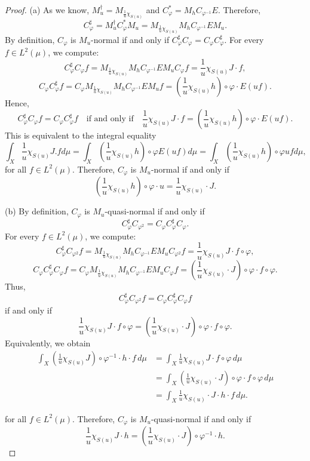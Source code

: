 \documentclass{amsart}
\theoremstyle{definition}\newtheorem{defn}[thm]{Definition}
\theoremstyle{remark}
\numberwithin{equation}{section}
\begin{document}
\begin{proof}
(a) As we know, \( M_u^\dagger = M_{\frac{1}{u} \chi_{S(u)}} \) and \( C_\varphi^* = M_h C_{\varphi^{-1}} E \). Therefore,
\[
C_\varphi^\sharp = M_u^\dagger C_\varphi^* M_u = M_{\frac{1}{u} \chi_{S(u)}} M_h C_{\varphi^{-1}} E M_u.
\]
By definition, \( C_\varphi \) is \( M_u \)-normal if and only if \( C_\varphi^\sharp C_\varphi = C_\varphi C_\varphi^\sharp \). For every \( f \in L^2(\mu) \), we compute:
\[
C_\varphi^\sharp C_\varphi f = M_{\frac{1}{u} \chi_{S(u)}} M_h C_{\varphi^{-1}} E M_u C_\varphi f = \frac{1}{u} \chi_{S(u)} J \cdot f,
\]
\[
C_\varphi C_\varphi^\sharp f = C_\varphi M_{\frac{1}{u} \chi_{S(u)}} M_h C_{\varphi^{-1}} E M_u f = \left( \frac{1}{u} \chi_{S(u)} h \right) \circ \varphi \cdot E(uf).
\]
Hence,
\[
C_\varphi^\sharp C_\varphi f = C_\varphi C_\varphi^\sharp f \quad \text{if and only if} \quad \frac{1}{u} \chi_{S(u)} J \cdot f = \left( \frac{1}{u} \chi_{S(u)} h \right) \circ \varphi \cdot E(uf).
\]
This is equivalent to the integral equality
$$\int_X\frac{1}{u}\chi_{S(u)}J.fd\mu=\int_X(\frac{1}{u}\chi_{S(u)}h)\circ\varphi E(uf)d\mu=\int_X(\frac{1}{u}\chi_{S(u)}h)\circ\varphi ufd\mu,$$
for all \( f \in L^2(\mu) \). Therefore, \( C_\varphi \) is \( M_u \)-normal if and only if
\[
\left( \frac{1}{u} \chi_{S(u)} h \right) \circ \varphi \cdot u = \frac{1}{u} \chi_{S(u)} \cdot J.
\]

\medskip

(b) By definition, \( C_\varphi \) is \( M_u \)-quasi-normal if and only if
\[
C_\varphi^\sharp C_{\varphi^2} = C_\varphi C_\varphi^\sharp C_\varphi.
\]
For every \( f \in L^2(\mu) \), we compute:
\[
C_\varphi^\sharp C_{\varphi^2} f = M_{\frac{1}{u} \chi_{S(u)}} M_h C_{\varphi^{-1}} E M_u C_{\varphi^2} f = \frac{1}{u} \chi_{S(u)} J \cdot f \circ \varphi,
\]
\[
C_\varphi C_\varphi^\sharp C_\varphi f = C_\varphi M_{\frac{1}{u} \chi_{S(u)}} M_h C_{\varphi^{-1}} E M_u C_\varphi f = \left( \frac{1}{u} \chi_{S(u)} \cdot J \right) \circ \varphi \cdot f \circ \varphi.
\]
Thus,
\[
C_\varphi^\sharp C_{\varphi^2} f = C_\varphi C_\varphi^\sharp C_\varphi f
\]
if and only if
\[
\frac{1}{u} \chi_{S(u)} J \cdot f \circ \varphi = \left( \frac{1}{u} \chi_{S(u)} \cdot J \right) \circ \varphi \cdot f \circ \varphi.
\]
Equivalently, we obtain
\begin{align*}
\int_X \left( \frac{1}{u} \chi_{S(u)} J \right) \circ \varphi^{-1} \cdot h \cdot f \, d\mu 
&= \int_X \frac{1}{u} \chi_{S(u)} J \cdot f \circ \varphi \, d\mu \\
&= \int_X \left( \frac{1}{u} \chi_{S(u)} \cdot J \right) \circ \varphi \cdot f \circ \varphi \, d\mu \\
&= \int_X \frac{1}{u} \chi_{S(u)} \cdot J \cdot h \cdot f \, d\mu.
\end{align*}

for all \( f \in L^2(\mu) \). Therefore, \( C_\varphi \) is \( M_u \)-quasi-normal if and only if
\[
\frac{1}{u} \chi_{S(u)} J \cdot h = \left( \frac{1}{u} \chi_{S(u)} \cdot J \right) \circ \varphi^{-1} \cdot h.
\]
\end{proof}
\end{document}
